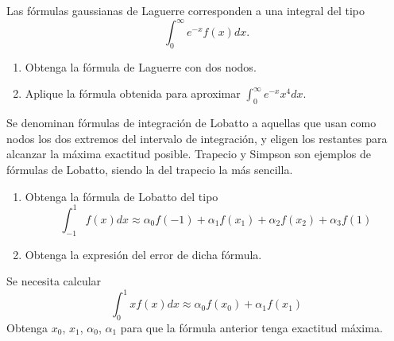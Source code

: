 \begin{ejercicio}\label{ej:2.1.28} Las fórmulas gaussianas de Laguerre corresponden a una integral del tipo
    \begin{equation*}
        \int_{0}^{\infty} e^{-x} f(x) dx.
    \end{equation*}
    \begin{enumerate}
        \item Obtenga la fórmula de Laguerre con dos nodos.
        \item Aplique la fórmula obtenida para aproximar $\int_{0}^{\infty} e^{-x} x^4 dx$.
    \end{enumerate}
\end{ejercicio}

\begin{ejercicio}\label{ej:2.1.29}
    Se denominan fórmulas de integración de Lobatto a aquellas que usan como nodos los dos extremos del intervalo de integración, y eligen los restantes para alcanzar la máxima exactitud posible. Trapecio y Simpson son ejemplos de fórmulas de Lobatto, siendo la del trapecio la más sencilla.
    \begin{enumerate}
        \item Obtenga la fórmula de Lobatto del tipo $$\int_{-1}^{1} f(x) dx \approx \alpha_0 f(-1) + \alpha_1 f(x_1) + \alpha_2 f(x_2) + \alpha_3 f(1)$$
        \item Obtenga la expresión del error de dicha fórmula.
    \end{enumerate}
\end{ejercicio}

\begin{ejercicio}\label{ej:2.1.30}
    Se necesita calcular $$\int_{0}^{1} x f(x) dx \approx \alpha_0 f(x_0) + \alpha_1 f(x_1)$$ Obtenga $x_0$, $x_1$, $\alpha_0$, $\alpha_1$ para que la fórmula anterior tenga exactitud máxima.
\end{ejercicio}
